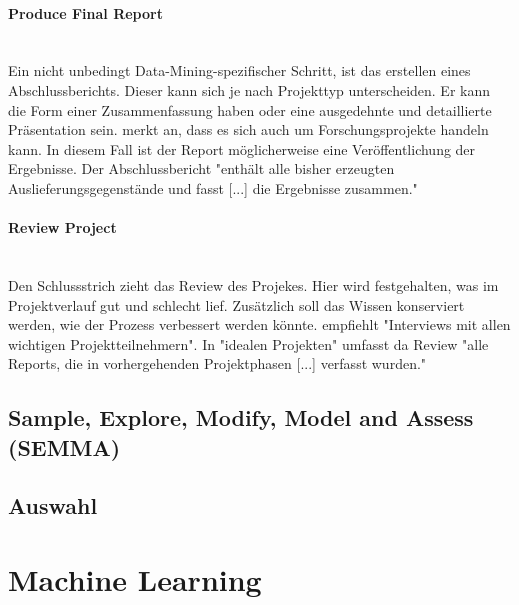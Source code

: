 \paragraph{Produce Final Report}\mbox{} \\
Ein nicht unbedingt Data-Mining-spezifischer Schritt, ist das erstellen eines Abschlussberichts. Dieser kann sich je nach Projekttyp unterscheiden. Er kann die Form einer Zusammenfassung haben oder eine ausgedehnte und detaillierte Präsentation sein. \citep[Punkt 1.4.1.1]{larose_discovering_2014} merkt an, dass es sich auch um Forschungsprojekte handeln kann. In diesem Fall ist der Report möglicherweise  eine Veröffentlichung der Ergebnisse. Der Abschlussbericht "enthält alle bisher erzeugten Auslieferungsgegenstände und fasst [...] die Ergebnisse zusammen."\citep[S~18; eigene Übersetzung]{shearer_crisp-dm_2000}

\paragraph{Review Project}\mbox{} \\
Den Schlussstrich zieht das Review des Projekes. Hier wird festgehalten, was im Projektverlauf gut und schlecht lief. Zusätzlich soll das Wissen konserviert werden, wie der Prozess verbessert werden könnte.   \newline
\citep[S.~18; eigene Übersetzung]{shearer_crisp-dm_2000} empfiehlt "Interviews mit allen wichtigen Projektteilnehmern". In "idealen Projekten" umfasst da Review "alle Reports, die in vorhergehenden Projektphasen [...] verfasst wurden."\citep[S.~29; eigene Übersetzung]{chapman_crisp-dm_2000}







\subsection{Sample, Explore, Modify, Model and Assess (SEMMA)}
\subsection{Auswahl}


\section{Machine Learning}\label{sec:MachineLearning} 

